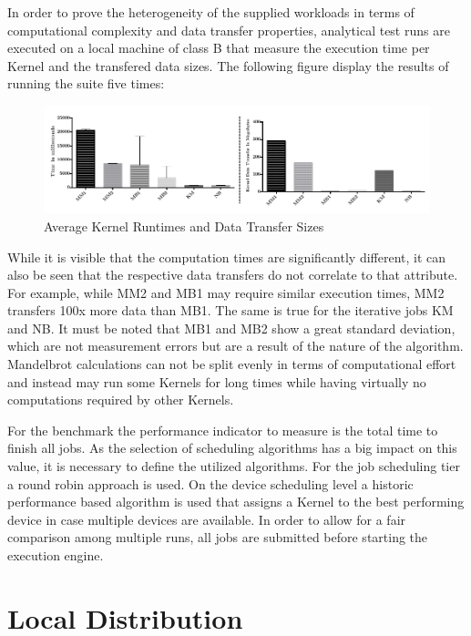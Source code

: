 In order to prove the heterogeneity of the supplied workloads in terms of computational complexity and data transfer properties, analytical test runs are executed on a local machine of class B that measure the execution time per Kernel and the transfered data sizes. The following figure display the results of running the suite five times:

\begin{figure}[H]
	
	\includegraphics[width=1.0\textwidth]{images/benchmark_kernel_data_transfers.pdf}
	\centering
	\caption{Average Kernel Runtimes and Data Transfer Sizes}
	\label{img:benchmark_kernel_attributes}
\end{figure}

While it is visible that the computation times are significantly different, it can also be seen that the respective data transfers do not correlate to that attribute. For example, while MM2 and MB1 may require similar execution times, MM2 transfers 100x more data than MB1. The same is true for the iterative jobs KM and NB. It must be noted that MB1 and MB2 show a great standard deviation, which are not measurement errors but are a result of the nature of the algorithm. Mandelbrot calculations can not be split evenly in terms of computational effort and instead may run some Kernels for long times while having virtually no computations required by other Kernels.

For the benchmark the performance indicator to measure is the total time to finish all jobs. As the selection of scheduling algorithms has a big impact on this value, it is necessary to define the utilized algorithms. For the job scheduling tier a round robin approach is used. On the device scheduling level a historic performance based algorithm is used that assigns a Kernel to the best performing device in case multiple devices are available. In order to allow for a fair comparison among multiple runs, all jobs are submitted before starting the execution engine.

\section{Local Distribution}
\label{local_distribution}

